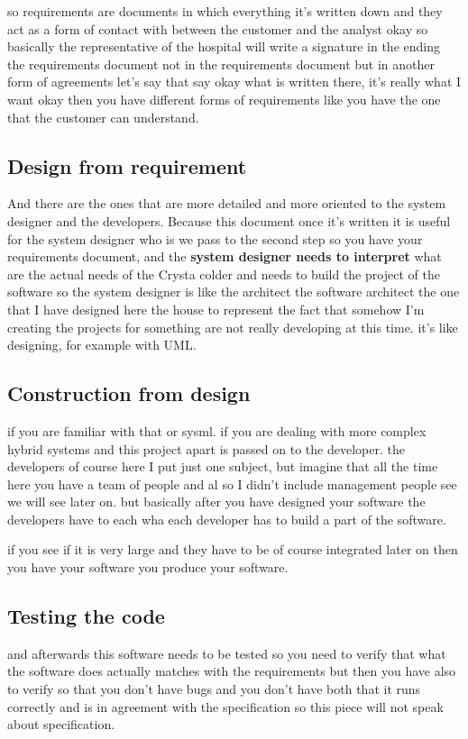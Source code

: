 \documentclass[conference, compsoc, twoside]{IEEEtran}
\begin{document}
so requirements are documents in which everything it's written down and they act as a form of contact with between the customer and the analyst okay so basically the representative of the hospital will write a signature in the ending the requirements document not in the requirements document but in another form of agreements let's say that say okay what is written there, it's really what I want okay then you have different forms of requirements like you have the one that the customer can understand. 

\subsection{Design from requirement}
And there are the ones that are more detailed and more oriented to the system designer and the developers.
Because this document once it's written it is useful for the system designer who is we pass to the second step so you have your requirements document, 
and the \textbf{system designer needs to interpret} what are the actual needs of the Crysta colder and needs to build the project of the software so the system designer is like the architect the software architect the one that I have designed here the house to represent the fact that somehow I'm creating the projects for something are not really developing at this time. 
it's like designing, for example with UML. 

\subsection{Construction from design}
if you are familiar with that or sysml.
if you are dealing with more complex hybrid systems and this project apart is passed on to the developer.
the developers of course here I put just one subject, but imagine that all the time here you have a team of people and al
so I didn't include management people see we will see later on. 
but basically after you have designed your software the developers have to each wha each developer has to build a part of the software.

if you see if it is very large and they have to be of course integrated later on then you have your software you produce your software.

\subsection{Testing the code}
and afterwards this software needs to be tested so you need to verify that what the software does actually matches with the requirements but then you have also to verify so that you don't have bugs and you don't have both that it runs correctly and is in agreement with the specification so this piece will not speak about specification.
\end{document}
